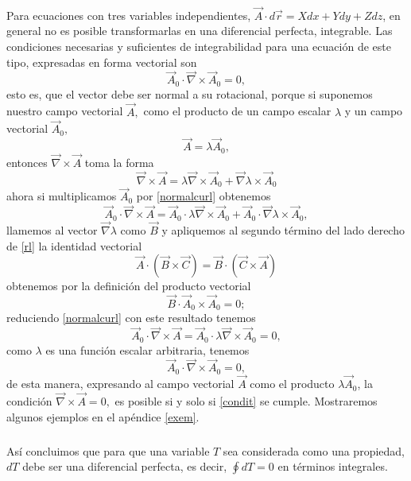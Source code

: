 \documentclass{article}
\theoremstyle{definition} \newtheorem{defi}{Definici\'on}
\theoremstyle{definition} \newtheorem{teo}{Teorema}
\theoremstyle{definition} \newtheorem{cor}{Corolario}
\begin{document}
\paragraph{}
Para ecuaciones con tres variables independientes, $\vec A \cdot d\vec r = X dx + Y dy + Z dz$, en general no es posible transformarlas en una diferencial perfecta, integrable. Las condiciones necesarias y suficientes de integrabilidad para una ecuaci\'on de este tipo, expresadas en forma vectorial son
\begin{equation}\label{condit}
\vec A_0 \cdot \vec \nabla \times \vec A_0 = 0,
\end{equation}
esto es, que el vector debe ser normal a su rotacional, porque si suponemos nuestro campo vectorial $\vec A,$ como el producto de un campo escalar $\lambda$ y un campo vectorial $\vec A_0,$
$$\vec A = \lambda \vec A_0,$$
entonces $\vec \nabla \times \vec A$ toma la forma
\begin{equation}\label{normalcurl}
\vec \nabla \times \vec A = \lambda \vec \nabla \times \vec A_0 + \vec \nabla \lambda \times \vec A_0
\end{equation}
ahora si multiplicamos $\vec A_0$ por \eqref{normalcurl} obtenemos
\begin{equation}\label{rl}
\vec A_0 \cdot \vec \nabla \times \vec A = \vec A_0 \cdot \lambda \vec \nabla \times \vec A_0 + \vec A_0 \cdot \vec \nabla \lambda \times \vec A_0,
\end{equation}
llamemos al vector $\vec \nabla \lambda$ como $\vec B$ y apliquemos al segundo t\'ermino del lado derecho de \eqref{rl} la identidad vectorial
\begin{equation}
\vec A \cdot (\vec B \times \vec C) = \vec B \cdot (\vec C \times \vec A)
\end{equation}
obtenemos por la definici\'on del producto vectorial
\begin{equation}
\vec B \cdot \vec A_0 \times \vec A_0 = 0;
\end{equation}
reduciendo \eqref{normalcurl} con este resultado tenemos
\begin{equation}
\vec A_0 \cdot \vec \nabla \times \vec A = \vec A_0 \cdot \lambda \vec \nabla \times \vec A_0 = 0,
\end{equation}
como $\lambda$ es una funci\'on escalar arbitraria, tenemos
\begin{equation}
\vec A_0 \cdot \vec \nabla \times \vec A_0 = 0,
\end{equation}
de esta manera, expresando al campo vectorial $\vec A$ como el producto $\lambda \vec A_0$, la condici\'on $\vec \nabla \times \vec A =0,$ es posible si y solo si \eqref{condit} se cumple. Mostraremos algunos ejemplos en el ap\'endice \ref{exem}.
\subparagraph{}
As\'i concluimos que para que una variable $T$ sea considerada como una propiedad, $dT$ debe ser una diferencial perfecta, es decir, $\oint dT = 0$ en t\'erminos integrales. 
\end{document}
